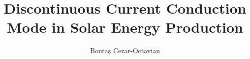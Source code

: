 \documentclass[a4paper,11pt]{scrreprt}                       %
\def \chapters {./chapters}      														 %
\begin{document}

\title{Discontinuous Current Conduction Mode in Solar Energy Production}					    %
\author{Bontaș Cezar-Octavian}																				%

\maketitle


\tableofcontents
\printnoidxglossaries																				%
\listoffigures
{}
\listoftables
{}

\clearpage









%    

\cleardoublepage

\printbibliography[heading=bibintoc]
\end{document}
